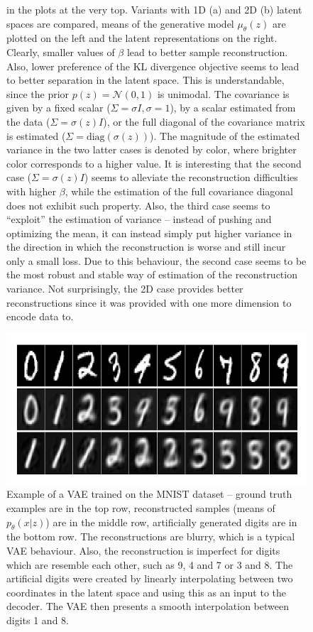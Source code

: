 \begin{figure}
{in the plots at the very top. Variants with 1D (a) and 2D (b) latent
spaces are compared, means of the generative model $\mu_{\theta}(z)$
are plotted on the left and the latent representations on the right.
Clearly, smaller values of $\beta$ lead to better sample reconstruction.
Also, lower preference of the KL divergence objective seems to lead
to better separation in the latent space. This is understandable,
since the prior $p(z)=\mathcal{N}(0,1)$ is unimodal. The covariance
is given by a fixed scalar ($\Sigma=\sigma I,\sigma=1$), by a scalar
estimated from the data ($\Sigma=\sigma(z)I$), or the full diagonal
of the covariance matrix is estimated ($\Sigma=\text{diag}(\sigma(z))$).
The magnitude of the estimated variance in the two latter cases is
denoted by color, where brighter color corresponds to a higher value.
It is interesting that the second case ($\Sigma=\sigma(z)I$) seems
to alleviate the reconstruction difficulties with higher $\beta$,
while the estimation of the full covariance diagonal does not exhibit
such property. Also, the third case seems to ``exploit'' the estimation
of variance -- instead of pushing and optimizing the mean, it can
instead simply put higher variance in the direction in which the reconstruction
is worse and still incur only a small loss. Due to this behaviour,
the second case seems to be the most robust and stable way of estimation
of the reconstruction variance. Not surprisingly, the 2D case provides
better reconstructions since it was provided with one more dimension
to encode data to.}
\label{fig:betavae}
\end{figure}

\begin{figure}
\centering{}\includegraphics[scale=0.8]{data/chapter_survey/mnist_reconstruction_generation}\caption{Example of a VAE trained on the MNIST dataset -- ground truth examples
are in the top row, reconstructed samples (means of $p_{\theta}(x|z)$)
are in the middle row, artificially generated digits are in the bottom
row. The reconstructions are blurry, which is a typical VAE behaviour.
Also, the reconstruction is imperfect for digits which are resemble
each other, such as 9, 4 and 7 or 3 and 8. The artificial digits were
created by linearly interpolating between two coordinates in the latent
space and using this as an input to the decoder. The VAE then presents
a smooth interpolation between digits 1 and 8.}
\label{fig:mnist_reconstruction}
\end{figure}
 
